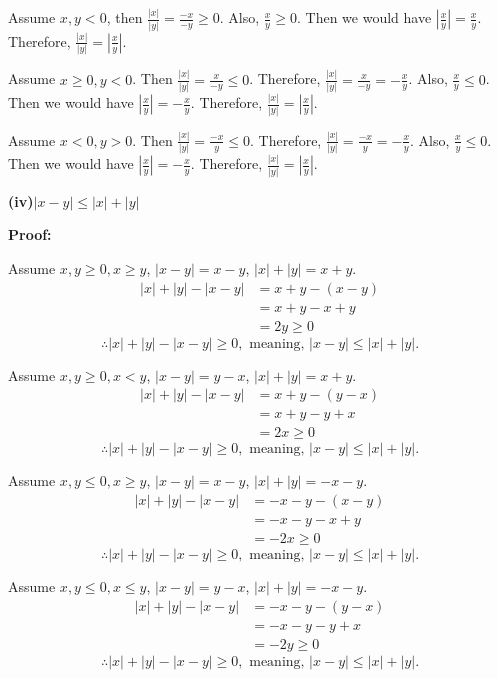 \documentclass[a4paper,12pt]{report}
\begin{document}
\noindent
Assume $x,y<0$, then $\frac{|x|}{|y|}=\frac{-x}{-y}\geq 0$. Also, $\frac{x}{y}\geq 0$. Then we would have $|\frac{x}{y}|=\frac{x}{y}$. Therefore, $\frac{|x|}{|y|}=|\frac{x}{y}|$.

\noindent
Assume $x\geq 0, y<0$. Then $\frac{|x|}{|y|}=\frac{x}{-y}\leq 0$. Therefore, $\frac{|x|}{|y|}=\frac{x}{-y}=-\frac{x}{y}$. Also,  $\frac{x}{y}\leq 0$. Then we would have $|\frac{x}{y}|=-\frac{x}{y}$. Therefore, $\frac{|x|}{|y|}=|\frac{x}{y}|$.

\noindent
Assume $x < 0, y>0$. Then $\frac{|x|}{|y|}=\frac{-x}{y}\leq 0$. Therefore, $\frac{|x|}{|y|}=\frac{-x}{y}=-\frac{x}{y}$. Also,  $\frac{x}{y}\leq 0$. Then we would have $|\frac{x}{y}|=-\frac{x}{y}$. Therefore, $\frac{|x|}{|y|}=|\frac{x}{y}|$.

\pagebreak
\noindent
\textbf{(iv)}$|x-y|\leq|x|+|y|$

\noindent
\textbf{Proof: }

\noindent
Assume $x, y\geq 0, x\geq y$, $|x-y|=x-y$, $|x|+|y| = x+y$.
\begin{align*}
 |x|+|y|-|x-y| & =x+y -(x-y) \\
 			   & =x+y -x+y\\
 			   & =2y\geq 0
\end{align*}
\[\therefore |x|+|y|-|x-y|\geq 0, \text{ meaning, } |x-y|\leq|x|+|y|.\]

\noindent
Assume $x, y\geq 0, x< y$, $|x-y|=y-x$, $|x|+|y| = x+y$.
\begin{align*}
 |x|+|y|-|x-y| & =x+y -(y-x) \\
 			   & =x+y -y+x\\
 			   & =2x\geq 0
\end{align*}
\[\therefore |x|+|y|-|x-y|\geq 0, \text{ meaning, } |x-y|\leq|x|+|y|.\]

\noindent
Assume $x, y\leq 0, x\geq y$, $|x-y|=x-y$, $|x|+|y| = -x-y$.
\begin{align*}
 |x|+|y|-|x-y| & =-x-y -(x-y) \\
 			   & =-x-y -x+y\\
 			   & =-2x\geq 0
\end{align*}
\[\therefore |x|+|y|-|x-y|\geq 0, \text{ meaning, } |x-y|\leq|x|+|y|.\]

\noindent
Assume $x, y\leq 0, x\leq y$, $|x-y|=y-x$, $|x|+|y| = -x-y$.
\begin{align*}
 |x|+|y|-|x-y| & =-x-y -(y-x) \\
 			   & =-x-y -y+x\\
 			   & =-2y\geq 0
\end{align*}
\[\therefore |x|+|y|-|x-y|\geq 0, \text{ meaning, } |x-y|\leq|x|+|y|.\]
\end{document}
